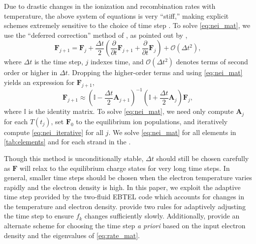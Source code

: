 Due to drastic changes in the ionization and recombination rates with temperature, the above system of equations is very ``stiff,'' making explicit schemes extremely sensitive to the choice of time step \citep{macneice_numerical_1984,bradshaw_numerical_2009}. To solve \autoref{eq:nei_mat}, we use the ``deferred correction'' method of \citet{npl_modern_1961}, as pointed out by \citet{macneice_numerical_1984},
\begin{equation*}
    \mathbf{F}_{j+1} = \mathbf{F}_j + \frac{\Delta t}{2}\left(\frac{\partial}{\partial t}\mathbf{F}_{j+1} + \frac{\partial}{\partial t}\mathbf{F}_j\right) + \mathcal{O}(\Delta t^2),
\end{equation*}
where $\Delta t$ is the time step, $j$ indexes time, and $\mathcal{O}(\Delta t^2)$ denotes terms of second order or higher in $\Delta t$. Dropping the higher-order terms and using \autoref{eq:nei_mat} yields an expression for $\mathbf{F}_{j+1}$,
\begin{equation}\label{eq:nei_iterative}
    \mathbf{F}_{j+1} \approx \left(\mathbb{I} - \frac{\Delta t}{2}\mathbf{A}_{j+1}\right)^{-1}\left(\mathbb{I} + \frac{\Delta t}{2}\mathbf{A}_{j}\right)\mathbf{F}_j,
\end{equation}
where $\mathbb{I}$ is the identity matrix. To solve \autoref{eq:nei_mat}, we need only compute $\mathbf{A}_j$ for each $T(t_j)$, set $\mathbf{F}_0$ to the equilibrium ion populations, and iteratively compute \autoref{eq:nei_iterative} for all $j$. We solve \autoref{eq:nei_mat} for all elements in \autoref{tab:elements} and for each strand in the \AR{}.

Though this method is unconditionally stable, $\Delta t$ should still be chosen carefully as $\mathbf{F}$ will relax to the equilibrium charge states for very long time steps. In general, smaller time steps should be chosen when the electron temperature varies rapidly and the electron density is high. In this paper, we exploit the adaptive time step provided by the two-fluid EBTEL code which accounts for changes in the temperature and electron density. \citet{macneice_numerical_1984} provide two rules for adaptively adjusting the time step to ensure $f_k$ changes sufficiently slowly. Additionally, \citet{shen_lagrangian_2015} provide an alternate scheme for choosing the time step \textit{a priori} based on the input electron density and the eigenvalues of \autoref{eq:rate_mat}.


